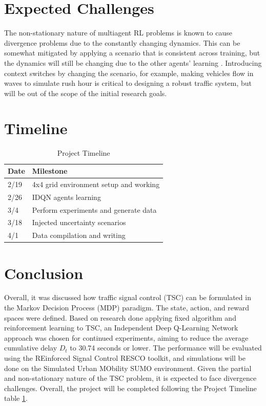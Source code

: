 \documentclass[letterpaper]{article} %
\begin{document}
\section{Expected Challenges}
The non-stationary nature of multiagent RL problems is known to cause divergence problems due to the constantly changing dynamics.
This can be somewhat mitigated by applying a scenario that is consistent across training, but the dynamics will still be changing due to the other agents' learning \cite{DBLP:journals/corr/abs-2004-04778}.
Introducing context switches by changing the scenario, for example, making vehicles flow in waves to simulate rush hour is critical to designing a robust traffic system, but will be out of the scope of the initial research goals.

\section{Timeline}

\begin{table}[H]
\centering
\begin{tabular}{ll}
\hline
\textbf{Date} & \textbf{Milestone}             \\ \hline
2/19 & 4x4 grid environment setup and working  \\
2/26 & IDQN agents learning                    \\
3/4  & Perform experiments and generate data   \\
3/18 & Injected uncertainty scenarios          \\
4/1  & Data compilation and writing            \\ \hline
\end{tabular}
\caption{Project Timeline}
\label{tab:project_timeline}
\end{table}

\section{Conclusion}
Overall, it was discussed how traffic signal control (TSC) can be formulated in the Markov Decision Process (MDP) paradigm. The state, action, and reward spaces were defined.
Based on research done applying fixed algorithm and reinforcement learning to TSC, an Independent Deep Q-Learning Network approach was chosen for continued experiments, aiming to reduce the average cumulative delay \(D_t\) to 30.74 seconds or lower.
The performance will be evaluated using the REinforced Signal Control RESCO toolkit, and simulations will be done on the Simulated Urban MObility SUMO environment.
Given the partial and non-stationary nature of the TSC problem, it is expected to face divergence challenges. Overall, the project will be completed following the Project Timeline table \ref{tab:project_timeline}.




\end{document}
